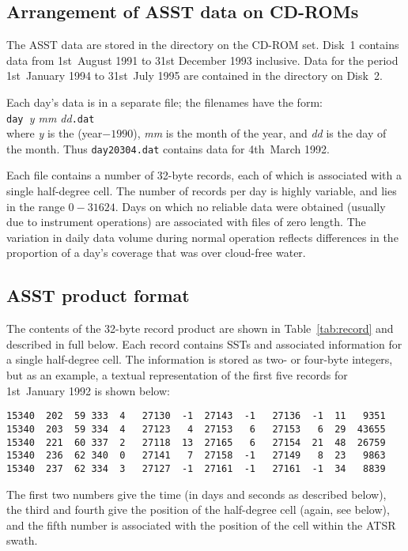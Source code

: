 \subsection{Arrangement of ASST data on CD-ROMs}
\label{subsec:arr}

The ASST data are stored in the directory  on the CD-ROM
set. Disk~1 contains data from 1st~August 1991 to 31st December 1993
inclusive.
Data for the period 1st~January 1994 to 31st~July 1995 are contained in 
the   directory on Disk~2.

Each day's data is in a separate file; the filenames have the form:\\
\hspace*{2cm} {\tt day }{\sl y mm dd}{\tt.dat}\\
where {\sl y} is the (year$-1990$), {\sl mm} is the month of the year,
and {\sl dd} is the day of the month.
Thus {\tt day20304.dat} contains data for 4th~March 1992.

Each file contains a number of 32-byte records, each of which 
is associated with a single half-degree cell.
The number of records per day is highly variable, and lies in the range
$0-31624$.
Days on which no reliable data were obtained (usually due to instrument operations)
are associated with files of zero length.
The variation in daily data volume during normal operation
reflects differences in the proportion of a day's coverage that was over 
cloud-free water.



\subsection{ASST product format}

 
The contents of the 32-byte record product are shown in Table~\ref{tab:record}
and described in full below.
Each record contains SSTs and associated information for a single 
half-degree cell.
The information is stored as two- or four-byte integers, but 
as an example, a textual representation of the first five records 
for 1st~January 1992 is shown below:

\begin{footnotesize}{\begin{verbatim}
15340  202  59 333  4   27130  -1  27143  -1   27136  -1  11   9351
15340  203  59 334  4   27123   4  27153   6   27153   6  29  43655
15340  221  60 337  2   27118  13  27165   6   27154  21  48  26759
15340  236  62 340  0   27141   7  27158  -1   27149   8  23   9863
15340  237  62 334  3   27127  -1  27161  -1   27161  -1  34   8839
\end{verbatim}}\end{footnotesize}
The first two numbers give the time (in days and seconds as described below), 
the third and fourth give the position of the half-degree cell 
(again, see below),
and the fifth number is associated with the position of the cell within
the ATSR swath.

